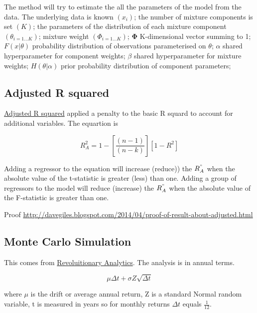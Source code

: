 \documentclass[12pt, a4paper, oneside]{article}\usepackage[]{graphicx}\usepackage[]{color}
\begin{document}
The method will try to estimate the all the parameters of the model from the data.  The underlying data is known $(x_i)$; the number of mixture components is set $(K)$; the parameters of the distribution of each mixture component $(\theta_{i=1\dots K})$; mixture weight $(\Phi_{i = 1\dots K})$; $\mathbf{\Phi}$ K-dimensional vector summing to 1; $F(x|\theta)$ probability distribution of observations parameterised on $\theta$; $\alpha$ shared hyperparameter for component weights; $\beta$ shared hyperparameter for mixture weights; $H(\theta|\alpha)$ prior probability distribution of component parameters; 

\subsection{Adjusted R squared}
\href{http://davegiles.blogspot.ca/2013/05/when-will-adjusted-r-squared-increase.html}{Adjusted R squared} applied a penalty to the basic R squard to account for additional variables.  The equartion is 

\begin{equation}
R_A^2 = 1 - \left [ \frac{(n-1)}{(n-k)} \right ] [1 - R^2]
\end{equation}

Adding a regressor to the equation will increase (reduce)) the $R_A^"$ when the absolute value of the t-statistic is greater (less) than one. Adding a group of regressors to the model will reduce (increase) the $R_A^"$ when the absolute value of the F-statistic is greater than one.  

Proof \href{http://davegiles.blogspot.com/2014/04/proof-of-result-about-adjusted.html}{http://davegiles.blogspot.com/2014/04/proof-of-result-about-adjusted.html}

\subsection{Monte Carlo Simulation}
This comes from \href{http://blog.revolutionanalytics.com/2014/04/quantitative-finance-applications-in-r-5.html}{Revoluitionary Analytics}.  The analysis is in annual terms.  

\begin{equation}
\mu \Delta t + \sigma Z \sqrt{\Delta t}
\end{equation}

where $\mu$ is the drift or average annual return, Z is a standard Normal random variable, t is measured in years so for monthly returns $\Delta t$ equals $\frac{1}{12}$.
\end{document}
